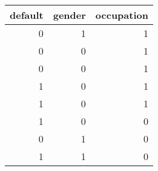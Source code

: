 \begin{tabular}{rrr}
    \toprule
    default & gender & occupation \\
    \midrule
    0 & 1 & 1 \\
    0 & 0 & 1 \\
    0 & 0 & 1 \\
    1 & 0 & 1 \\
    1 & 0 & 1 \\
    1 & 0 & 0 \\
    0 & 1 & 0 \\
    1 & 1 & 0 \\
    \bottomrule
\end{tabular}